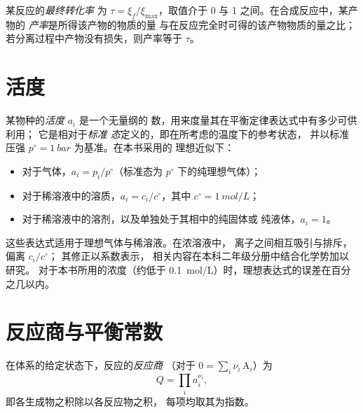 \begin{definition}[最终转化率，产率]\label{def:b1:extent-q-and-k:fractional-extent}
某反应的\emph{最终转化率}
为 $\tau = \xi_f/\xi_{\max}$，取值介于 0 与 1 之间。在合成反应中，某产物的
\emph{产率}是所得该产物的物质的量
与在反应完全时可得的该产物物质的量之比；
若分离过程中产物没有损失，则产率等于 $\tau$。
\end{definition}

\section{活度}

\begin{definition}[标准态，活度]\label{def:b1:extent-q-and-k:activity}
某物种的\emph{活度} $a_i$ 是一个无量纲的
数，用来度量其在平衡定律表达式中有多少可供利用；
它是相对于\emph{标准
态}定义的，即在所考虑的温度下的参考状态，
并以标准压强 $p^\circ = \qty{1}{bar}$ 为基准。在本书采用的
理想近似下：
\begin{itemize}
  \item 对于气体，$a_i = p_i/p^\circ$（标准态为
        $p^\circ$ 下的纯理想气体）；
  \item 对于稀溶液中的溶质，$a_i = c_i/c^\circ$，其中
        $c^\circ = \qty{1}{mol/L}$；
  \item 对于稀溶液中的溶剂，以及单独处于其相中的纯固体或
        纯液体，$a_i = 1$。
\end{itemize}
\end{definition}

\begin{remark}[理想与实际]\label{rem:b1:extent-q-and-k:ideal}
这些表达式适用于理想气体与稀溶液。在浓溶液中，
离子之间相互吸引与排斥，偏离 $c_i/c^\circ$；
其修正以系数表示，
相关内容在本科二年级分册中结合化学势加以研究。
对于本书所用的浓度（约低于
\qty{0.1}{mol/L}）时，理想表达式的误差在百分之几以内。
\end{remark}

\section{反应商与平衡常数}

\begin{definition}[反应商]\label{def:b1:extent-q-and-k:quotient}
在体系的给定状态下，反应的\emph{反应商}
（对于 $0 = \sum_i \nu_i\,\mathrm{A}_i$）为
\[
  Q = \prod_i a_i^{\nu_i} ,
\]
即各生成物之积除以各反应物之积，
每项均取其为指数。
\end{definition}

